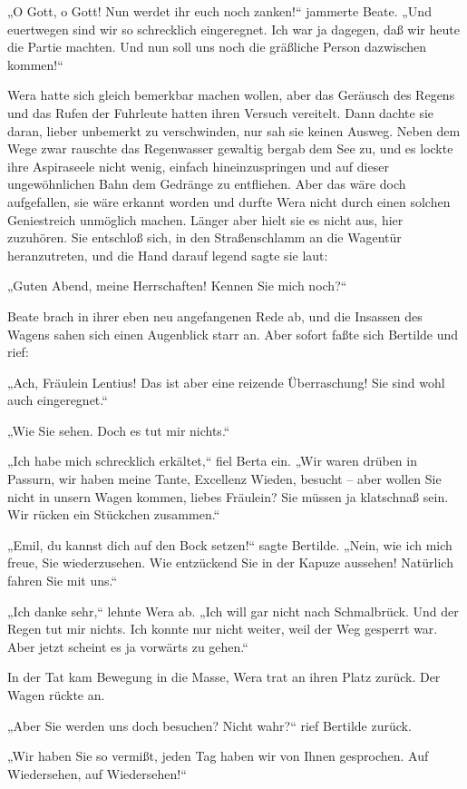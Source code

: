 „O Gott, o Gott! Nun werdet ihr euch noch zanken!“ jammerte Beate.
„Und euertwegen sind wir so schrecklich eingeregnet. Ich war ja
dagegen, daß wir heute die Partie machten. Und nun soll uns noch
die gräßliche Person dazwischen kommen!“

Wera hatte sich gleich bemerkbar machen wollen, aber das Geräusch
des Regens und das Rufen der Fuhrleute hatten ihren Versuch
vereitelt. Dann dachte sie daran, lieber unbemerkt zu verschwinden,
nur sah sie keinen Ausweg. Neben dem Wege zwar rauschte das
Regenwasser gewaltig bergab dem See zu, und es lockte ihre
Aspiraseele nicht wenig, einfach hineinzuspringen und auf dieser
ungewöhnlichen Bahn dem Gedränge zu entfliehen. Aber das wäre doch
aufgefallen, sie wäre erkannt worden und durfte Wera nicht durch
einen solchen Geniestreich unmöglich machen. Länger aber hielt sie
es nicht aus, hier zuzuhören. Sie entschloß sich, in den
Straßenschlamm an die Wagentür heranzutreten, und die Hand darauf
legend sagte sie laut:

„Guten Abend, meine Herrschaften! Kennen Sie mich noch?“

Beate brach in ihrer eben neu angefangenen Rede ab, und die
Insassen des Wagens sahen sich einen Augenblick starr an. Aber
sofort faßte sich Bertilde und rief:

„Ach, Fräulein Lentius! Das ist aber eine reizende Überraschung!
Sie sind wohl auch eingeregnet.“

„Wie Sie sehen. Doch es tut mir nichts.“

„Ich habe mich schrecklich erkältet,“ fiel Berta ein. „Wir waren
drüben in Passurn, wir haben meine Tante, Excellenz Wieden, besucht
– aber wollen Sie nicht in unsern Wagen kommen, liebes Fräulein?
Sie müssen ja klatschnaß sein. Wir rücken ein Stückchen zusammen.“

„Emil, du kannst dich auf den Bock setzen!“ sagte Bertilde. „Nein,
wie ich mich freue, Sie wiederzusehen. Wie entzückend Sie in der
Kapuze aussehen! Natürlich fahren Sie mit uns.“

„Ich danke sehr,“ lehnte Wera ab. „Ich will gar nicht nach
Schmalbrück. Und der Regen tut mir nichts. Ich konnte nur nicht
weiter, weil der Weg gesperrt war. Aber jetzt scheint es ja
vorwärts zu gehen.“

In der Tat kam Bewegung in die Masse, Wera trat an ihren Platz
zurück. Der Wagen rückte an.

„Aber Sie werden uns doch besuchen? Nicht wahr?“ rief Bertilde
zurück.

„Wir haben Sie so vermißt, jeden Tag haben wir von Ihnen
gesprochen. Auf Wiedersehen, auf Wiedersehen!“

